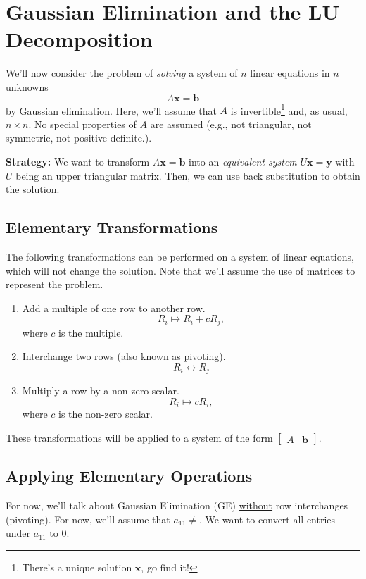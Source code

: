 \documentclass[letterpaper]{article}
\newcommand{\0}{\mathbf{0}}
\newcommand{\y}{\mathbf{y}}
\renewcommand{\b}{\mathbf{b}}
\newcommand{\x}{\mathbf{x}}
\begin{document}
\section{Gaussian Elimination and the LU Decomposition}
We'll now consider the problem of \emph{solving} a system of $n$ linear equations in $n$ unknowns \[A\x = \b\] by Gaussian elimination. Here, we'll assume that $A$ is invertible\footnote{There's a unique solution $\x$, go find it!} and, as usual, $n \times n$. No special properties of $A$ are assumed (e.g., not triangular, not symmetric, not positive definite.).

\begin{mdframed}
    \textbf{Strategy:} We want to transform $A\x = \b$ into an \emph{equivalent system} $U\x = \y$ with $U$ being an upper triangular matrix. Then, we can use back substitution to obtain the solution.
\end{mdframed}

\subsection{Elementary Transformations}
The following transformations can be performed on a system of linear equations, which will not change the solution. Note that we'll assume the use of matrices to represent the problem. 
\begin{enumerate}
    \item Add a multiple of one row to another row.
    \[R_i \mapsto R_i + cR_j,\]
    where $c$ is the multiple. 

    \item Interchange two rows (also known as pivoting). 
    \[R_i \leftrightarrow R_j\]

    \item Multiply a row by a non-zero scalar. 
    \[R_i \mapsto cR_i,\]
    where $c$ is the non-zero scalar.
\end{enumerate}
These transformations will be applied to a system of the form $\begin{bmatrix}
    A & \b
\end{bmatrix}$. 

\subsection{Applying Elementary Operations}
For now, we'll talk about Gaussian Elimination (GE) \underline{without} row interchanges (pivoting). For now, we'll assume that $a_{11} \neq$. We want to convert all entries under $a_{11}$ to 0. 
\end{document}

